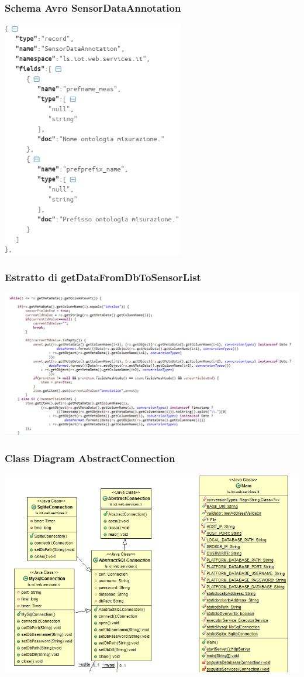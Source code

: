 \documentclass{beamer}
\begin{document}
\begin{frame}
\frametitle{Schema Avro SensorDataAnnotation}
\includegraphics[width=0.6\textwidth]{images/sensordataannotation.png}
\end{frame}

\begin{frame}
\frametitle{Estratto di getDataFromDbToSensorList}
\includegraphics[width=1\textwidth]{images/popolamento-json.png}
\end{frame}

\begin{frame}
\frametitle{Class Diagram AbstractConnection}
\includegraphics[width=1\textwidth]{images/main.png}
\end{frame}
\end{document}
